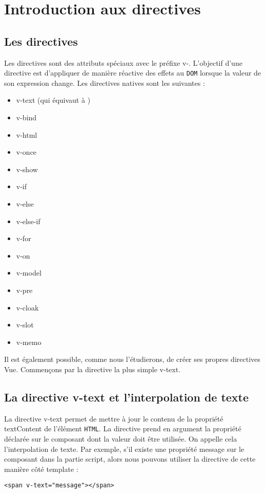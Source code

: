 \section{Introduction aux directives}
\subsection{Les directives}
Les directives sont des attributs spéciaux avec le préfixe {\color{monOrange}v-}. L'objectif d'une directive est d'appliquer de manière réactive des effets au {\tt DOM} lorsque la valeur de son expression change. Les directives natives sont les suivantes :
\begin{itemize}
\item v-text (qui équivaut à {{ }})
\item v-bind
\item v-html
\item v-once
\item v-show
\item v-if
\item v-else
\item v-else-if
\item v-for
\item v-on
\item v-model
\item v-pre
\item v-cloak
\item v-slot
\item v-memo
\end{itemize}

Il est également possible, comme nous l'étudierons, de créer ses propres directives {\color{monOrange}Vue}. Commençons par la directive la plus simple v-text.

\subsection{La directive {\color{monOrange}v-text} et l'interpolation de texte}
La directive {\color{monOrange}v-text} permet de mettre à jour le contenu de la propriété textContent de l'élément {\tt HTML}. La directive prend en argument la propriété déclarée sur le composant dont la valeur doit être utilisée. On appelle cela l'interpolation de texte. Par exemple, s'il existe une propriété message sur le composant dans la partie script, alors nous pouvons utiliser la directive de cette manière côté template :
\begin{verbatim}
<span v-text="message"></span>
\end{verbatim}

